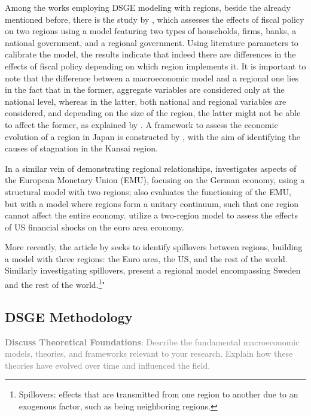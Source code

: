 \documentclass[../thesis.tex]{subfiles}
\begin{document}
	Among the works employing DSGE modeling with regions, beside the already mentioned before, there is the study by \textcite{tamegawa_two-region_2012}, which assesses the effects of fiscal policy on two regions using a model featuring two types of households, firms, banks, a national government, and a regional government. Using literature parameters to calibrate the model, the results indicate that indeed there are differences in the effects of fiscal policy depending on which region implements it. It is important to note that the difference between a macroeconomic model and a regional one lies in the fact that in the former, aggregate variables are considered only at the national level, whereas in the latter, both national and regional variables are considered, and depending on the size of the region, the latter might not be able to affect the former, as explained by \textcite{tamegawa_constructing_2013}. 	A framework to assess the economic evolution of a region in Japan is constructed by \textcite{okano_development_2015}, with the aim of identifying the causes of stagnation in the Kansai region.
	
	In a similar vein of demonstrating regional relationships, \textcite{pytlarczyk_estimated_2005} investigates aspects of the European Monetary Union (EMU), focusing on the German economy, using a structural model with two regions; \textcite{gali_optimal_2005} also evaluates the functioning of the EMU, but with a model where regions form a unitary continuum, such that one region cannot affect the entire economy. \textcite{alpanda_international_2014} utilize a two-region model to assess the effects of US financial shocks on the euro area economy.
	
	More recently, the article by \textcite{croitorov_financial_2020} seeks to identify spillovers between regions, building a model with three regions: the Euro area, the US, and the rest of the world. Similarly investigating spillovers, \textcite{corbo_maja_2020} present a regional model encompassing Sweden and the rest of the world.\footnote{ Spillovers: effects that are transmitted from one region to another due to an exogenous factor, such as being neighboring regions.}"

	\subsection*{DSGE Methodology}

	\textcolor{gray}{\textbf{Discuss Theoretical Foundations}: Describe the fundamental macroeconomic models, theories, and frameworks relevant to your research. Explain how these theories have evolved over time and influenced the field.}
\end{document}
